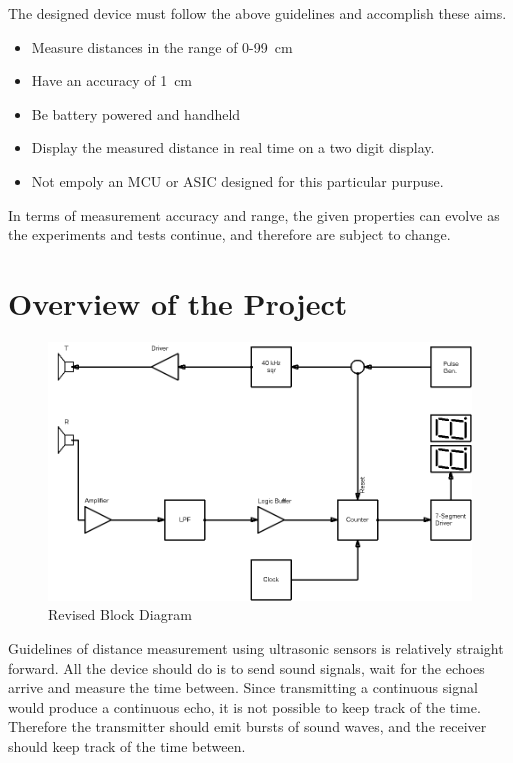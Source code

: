 \documentclass[12pt, a4paper]{article}
\begin{document}
        \noindent The designed device must follow the above guidelines and accomplish these aims. 
        \begin{itemize}
            \item Measure distances in the range of 0-99\SI{}{\centi\metre}
            \item Have an accuracy of \SI{1}{\centi\metre}
            \item Be battery powered and handheld
            \item Display the measured distance in real time on a two digit display.
            \item Not empoly an MCU or ASIC designed for this particular purpuse.
        \end{itemize}

        \noindent In terms of measurement accuracy and range, the given properties can evolve as the experiments and tests continue, and therefore are subject to change. 

        
    \pagebreak
    \section{Overview of the Project}

        \begin{figure}[H]\centering
            \includegraphics[width = \textwidth]{schematics/blockdiagram_v3.png}
            \caption[]{Revised Block Diagram}
        \end{figure}

        \bigskip
        Guidelines of distance measurement using ultrasonic sensors is relatively straight forward. All the device should do is to send sound signals, wait for the echoes arrive and measure the time between. Since transmitting a continuous signal would produce a continuous echo, it is not possible to keep track of the time. Therefore the transmitter should emit bursts of sound waves, and the receiver should keep track of the time between.
\end{document}
